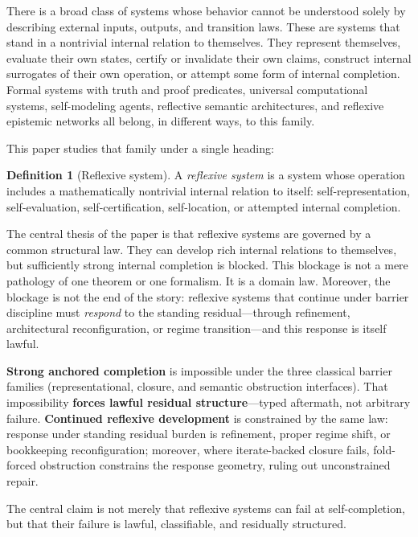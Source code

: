 \documentclass[11pt]{article}
\theoremstyle{plain}
\theoremstyle{definition}
\newtheorem{definition}[theorem]{Definition}
\theoremstyle{remark}
\begin{document}
There is a broad class of systems whose behavior cannot be understood solely by describing external inputs, outputs, and transition laws. These are systems that stand in a nontrivial internal relation to themselves. They represent themselves, evaluate their own states, certify or invalidate their own claims, construct internal surrogates of their own operation, or attempt some form of internal completion. Formal systems with truth and proof predicates, universal computational systems, self-modeling agents, reflective semantic architectures, and reflexive epistemic networks all belong, in different ways, to this family.

This paper studies that family under a single heading:

\begin{definition}[Reflexive system]
A \emph{reflexive system} is a system whose operation includes a mathematically nontrivial internal relation to itself: self-representation, self-evaluation, self-certification, self-location, or attempted internal completion.
\end{definition}

The central thesis of the paper is that reflexive systems are governed by a common structural law. They can develop rich internal relations to themselves, but sufficiently strong internal completion is blocked. This blockage is not a mere pathology of one theorem or one formalism. It is a domain law. Moreover, the blockage is not the end of the story: reflexive systems that continue under barrier discipline must \emph{respond} to the standing residual---through refinement, architectural reconfiguration, or regime transition---and this response is itself lawful.

\begin{keybox}[title=Governing theorem (plain prose)]
\textbf{Strong anchored completion} is impossible under the three classical barrier families (representational, closure, and semantic obstruction interfaces). That impossibility \textbf{forces lawful residual structure}---typed aftermath, not arbitrary failure. \textbf{Continued reflexive development} is constrained by the same law: response under standing residual burden is refinement, proper regime shift, or bookkeeping reconfiguration; moreover, where iterate-backed closure fails, fold-forced obstruction constrains the response geometry, ruling out unconstrained repair.
\end{keybox}

\noindent The central claim is not merely that reflexive systems can fail at self-completion, but that their failure is lawful, classifiable, and residually structured.
\end{document}

